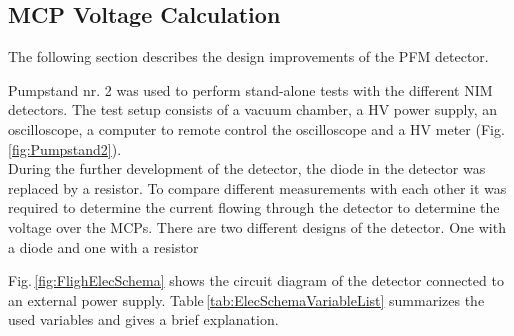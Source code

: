 		
		
		
		
		\subsection{MCP Voltage Calculation}\label{subsec:MCPVoltCalc} %
		
		The following section describes the design improvements of the PFM detector.
		
		
		
		
		Pumpstand nr. 2 was used to perform stand-alone tests with the different NIM detectors. The test setup consists of a vacuum chamber, a HV power supply, an oscilloscope, a computer to remote control the oscilloscope and a HV meter (Fig. \ref{fig:Pumpstand2}).\\
		
		During the further development of the detector, the diode in the detector was replaced by a resistor. To compare different measurements with each other it was required to determine the current flowing through the detector to determine the voltage over the MCPs.
		There are two different designs of the detector. One with a diode and one with a resistor
		
		Fig.\,\ref{fig:FlighElecSchema} shows the circuit diagram of the detector connected to an external power supply. Table\,\ref{tab:ElecSchemaVariableList} summarizes the used variables and gives a brief explanation.
		

